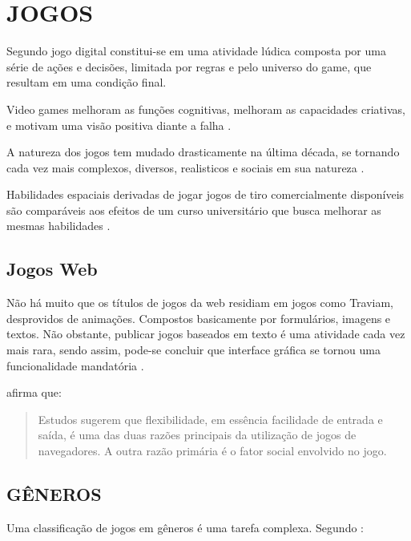 \section{JOGOS}
Segundo \autocite{indieGamesLemes} jogo digital constitui-se em uma
atividade lúdica composta por uma série de ações e decisões,
limitada por regras e pelo universo do game, que resultam em uma
condição final.

Video games melhoram as funções cognitivas, melhoram as capacidades criativas, e
motivam uma visão positiva diante a falha \autocite{gamebenefits}.

A natureza dos jogos tem mudado drasticamente na última década, se
tornando cada vez mais complexos, diversos, realisticos e sociais em sua
natureza \autocite{gamebenefits}.

Habilidades espaciais derivadas de jogar jogos de tiro comercialmente
disponíveis são comparáveis aos efeitos de um curso universitário
que busca melhorar as mesmas habilidades \autocite{gamebenefits}.

\subsection{Jogos Web}

Não há muito que os títulos de jogos da web residiam em jogos
como Traviam, desprovidos de animações. Compostos basicamente por
formulários, imagens e textos. Não obstante, publicar jogos baseados
em texto é uma atividade cada vez mais rara, sendo assim, pode-se
concluir que interface gráfica se tornou uma funcionalidade mandatória
\autocite{browserGamesTechnologyAndFuture}.


\cite{browserGamesTechnologyAndFuture} afirma que:
\begin{quote}
Estudos sugerem que flexibilidade, em essência facilidade de entrada
e saída, é uma das duas razões principais da utilização de jogos
de navegadores. A outra razão primária é o fator social envolvido no
jogo.
\end{quote}


\subsection{GÊNEROS}

Uma classificação de jogos em gêneros é uma tarefa complexa. Segundo \autocite{gamebenefits}:

